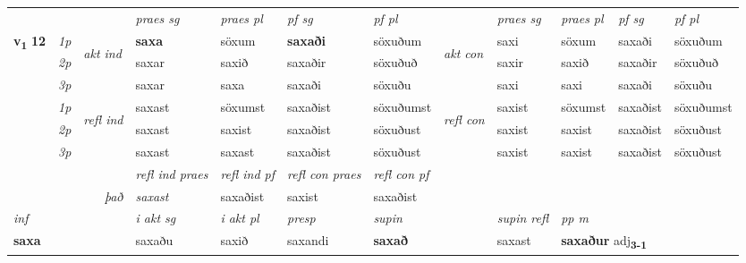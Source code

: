 \begin{longtable}[l]{X>{\footnotesize\itshape}llXXXXlXXXX}
 & &   & \textit{praes sg}  & \textit{praes pl}    & \textit{ pf sg} & \textit{pf pl} & & \textit{praes sg}  & \textit{praes pl}    & \textit{pf sg} & \textit{pf pl }  \\ \cmidrule{4-7} \cmidrule{9-12}
 \multirow{2}{*}{{{\textbf{v{\textsubscript{1}}} \Large{\textbf{12}}}}}  & 1p & \multirow{3}{*}{\begin{turn}{90}\textit{akt ind}\end{turn}} & \textbf{saxa} & söxum & \textbf{saxaði} & söxuðum & \multirow{3}{*}{\begin{turn}{90}\textit{akt con}\end{turn}} &saxi & söxum & saxaði & söxuðum\\*
 & 2p &  &  saxar  & saxið & saxaðir & söxuðuð & & saxir & saxið & saxaðir & söxuðuð \\*
 & 3p &  & saxar & saxa & saxaði & söxuðu & & saxi & saxi& saxaði & söxuðu \\*
\cmidrule{4-7} \cmidrule{9-12}
 & 1p & \multirow{3}{*}{\begin{turn}{90}\textit{refl ind}\end{turn}}  & saxast & söxumst & saxaðist & söxuðumst & \multirow{3}{*}{\begin{turn}{90}\textit{refl con}\end{turn}}  &saxist & söxumst & saxaðist & söxuðumst \\*
 & 2p &  & saxast & saxist & saxaðist & söxuðust & &saxist & saxist & saxaðist & söxuðust \\*
 & 3p  & & saxast & saxast & saxaðist & söxuðust & & saxist & saxist& saxaðist & söxuðust \\*
\cmidrule{4-7} \cmidrule{9-12}

 & && \textit{refl ind praes} & \textit{refl ind pf} & \textit{refl con praes} & \textit{refl con pf} \\*
\multicolumn{3}{r}{\textit{það}}& saxast & saxaðist & saxist & saxaðist \\*

\cmidrule{4-7}
   {\textit{inf}} & &  & \textit{i akt sg} & \textit{i akt pl}   & \textit{presp} & \textit{supin} && \textit{supin refl} & \textit{pp m} \\*
  {\textbf{saxa}} & && saxaðu  & saxið   & saxandi &  \textbf{saxað} && saxast & \multicolumn{2}{l}{\textbf{saxaður} adj\textbf{\textsubscript{3-1}}} \\*

\midrule


\end{longtable}
